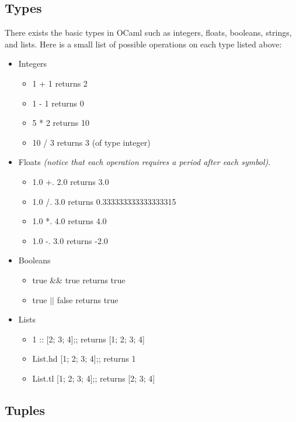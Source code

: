 \subsection{Types}
There exists the basic types in OCaml such as integers, floats, booleans, strings, and lists. Here is
a small list of possible operations on each type listed above:

\begin{itemize}

\item{Integers}
\begin{itemize}
\item 1 + 1 returns 2
\item 1 - 1 returns 0
\item 5 * 2 returns 10
\item 10 / 3 returns 3 (of type integer)\end{itemize}

\item{Floats} \textit{(notice that each operation requires a period after each symbol)}.
\begin{itemize}
\item 1.0 +. 2.0 returns 3.0
\item 1.0 /. 3.0 returns 0.333333333333333315
\item 1.0 *. 4.0 returns 4.0
\item 1.0 -. 3.0 returns -2.0 \end{itemize}

\item{Booleans}\begin{itemize}
\item true \&\& true returns true
\item true $\vert\vert$ false returns true \end{itemize}

\item{Lists} \begin{itemize}
\item 1 :: [2; 3; 4];; returns [1; 2; 3; 4]
\item List.hd [1; 2; 3; 4];; returns 1
\item List.tl [1; 2; 3; 4];; returns [2; 3; 4]
\end{itemize}
\end{itemize}

\subsection{Tuples}

